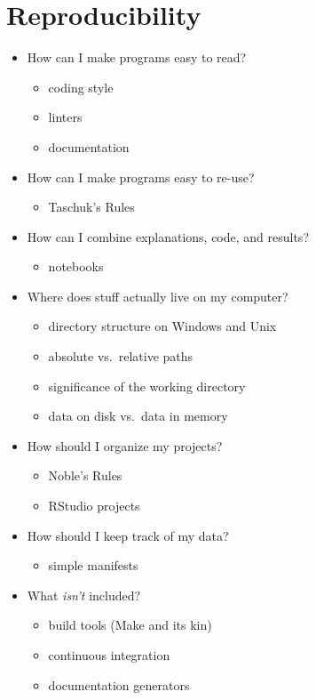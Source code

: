 \documentclass[]{Nemilov}
\providecommand{\tightlist}{%
  \setlength{\itemsep}{0pt}\setlength{\parskip}{0pt}}
\begin{document}
\hypertarget{reproducibility}{%
\section{Reproducibility}\label{reproducibility}}

\begin{itemize}
\tightlist
\item
  How can I make programs easy to read?

  \begin{itemize}
  \tightlist
  \item
    coding style
  \item
    linters
  \item
    documentation
  \end{itemize}
\item
  How can I make programs easy to re-use?

  \begin{itemize}
  \tightlist
  \item
    Taschuk's Rules
  \end{itemize}
\item
  How can I combine explanations, code, and results?

  \begin{itemize}
  \tightlist
  \item
    notebooks
  \end{itemize}
\item
  Where does stuff actually live on my computer?

  \begin{itemize}
  \tightlist
  \item
    directory structure on Windows and Unix
  \item
    absolute vs.~relative paths
  \item
    significance of the working directory
  \item
    data on disk vs.~data in memory
  \end{itemize}
\item
  How should I organize my projects?

  \begin{itemize}
  \tightlist
  \item
    Noble's Rules
  \item
    RStudio projects
  \end{itemize}
\item
  How should I keep track of my data?

  \begin{itemize}
  \tightlist
  \item
    simple manifests
  \end{itemize}
\item
  What \emph{isn't} included?

  \begin{itemize}
  \tightlist
  \item
    build tools (Make and its kin)
  \item
    continuous integration
  \item
    documentation generators
  \end{itemize}
\end{itemize}
\end{document}
